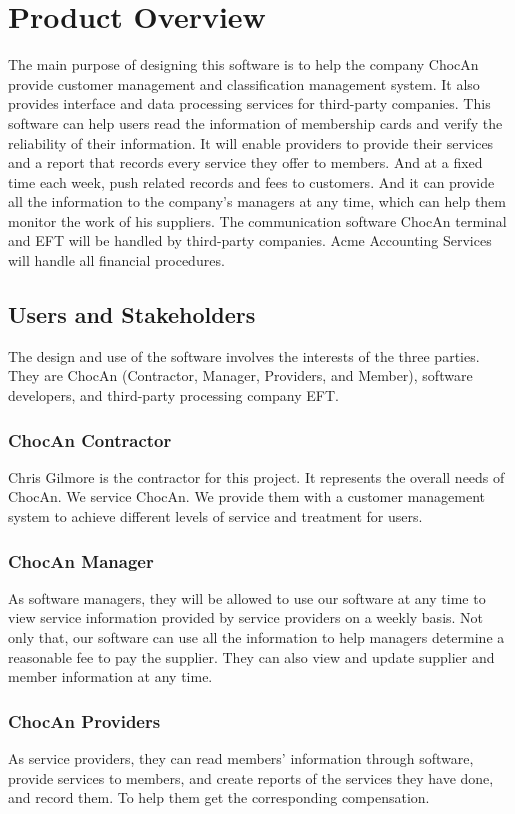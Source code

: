 \documentclass{article}
\begin{document}
\section{Product Overview}
The main purpose of designing this software is to help the company ChocAn provide customer management and classification management system. It also provides interface and data processing services for third-party companies. This software can help users read the information of membership cards and verify the reliability of their information. It will enable providers to provide their services and a report that records every service they offer to members. And at a fixed time each week, push related records and fees to customers. And it can provide all the information to the company's managers at any time, which can help them monitor the work of his suppliers. The communication software ChocAn terminal and EFT will be handled by third-party companies. Acme Accounting Services will handle all financial procedures.

\subsection{Users and Stakeholders}
The design and use of the software involves the interests of the three parties. They are ChocAn (Contractor, Manager, Providers, and Member), software developers, and third-party processing company EFT. 

\subsubsection{ChocAn Contractor}
Chris Gilmore is the contractor for this project. It represents the overall needs of ChocAn. We service ChocAn. We provide them with a customer management system to achieve different levels of service and treatment for users.

\subsubsection{ChocAn Manager}
As software managers, they will be allowed to use our software at any time to view service information provided by service providers on a weekly basis. Not only that, our software can use all the information to help managers determine a reasonable fee to pay the supplier. They can also view and update supplier and member information at any time.

\subsubsection{ChocAn Providers}
As service providers, they can read members' information through software, provide services to members, and create reports of the services they have done, and record them. To help them get the corresponding compensation.
\end{document}
